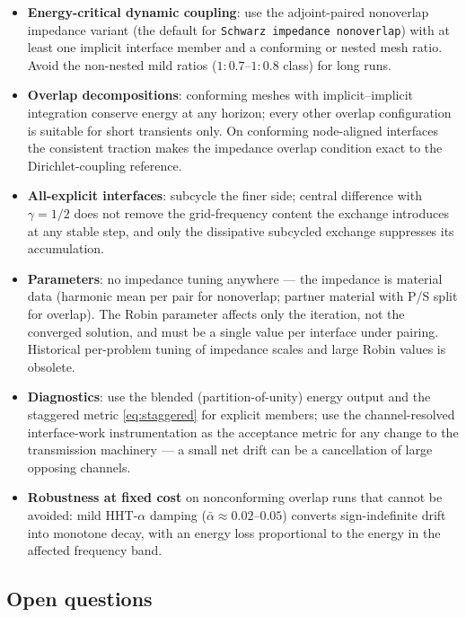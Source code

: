 \documentclass[11pt]{article}
\newcommand{\code}[1]{\texttt{#1}}
\begin{document}
\begin{itemize}[itemsep=2pt]
\item \textbf{Energy-critical dynamic coupling}: use the adjoint-paired
  nonoverlap impedance variant (the default for \code{Schwarz impedance
  nonoverlap}) with at least one implicit interface member and a conforming
  or nested mesh ratio. Avoid the non-nested mild ratios
  ($1{:}0.7$--$1{:}0.8$ class) for long runs.
\item \textbf{Overlap decompositions}: conforming meshes with
  implicit--implicit integration conserve energy at any horizon; every
  other overlap configuration is suitable for short transients only. On
  conforming node-aligned interfaces the consistent traction makes the
  impedance overlap condition exact to the Dirichlet-coupling reference.
\item \textbf{All-explicit interfaces}: subcycle the finer side; central
  difference with $\gamma = 1/2$ does not remove the grid-frequency
  content the exchange introduces at any stable step, and only the
  dissipative subcycled exchange suppresses its accumulation.
\item \textbf{Parameters}: no impedance tuning anywhere --- the impedance
  is material data (harmonic mean per pair for nonoverlap; partner material
  with P/S split for overlap). The Robin parameter affects only the
  iteration, not the converged solution, and must be a single value per
  interface under pairing. Historical per-problem tuning of impedance
  scales and large Robin values is obsolete.
\item \textbf{Diagnostics}: use the blended (partition-of-unity) energy
  output and the staggered metric \eqref{eq:staggered} for explicit
  members; use the channel-resolved interface-work instrumentation as the
  acceptance metric for any change to the transmission machinery --- a
  small net drift can be a cancellation of large opposing channels.
\item \textbf{Robustness at fixed cost} on nonconforming overlap runs that
  cannot be avoided: mild HHT-$\alpha$ damping
  ($\bar\alpha \approx 0.02$--$0.05$) converts sign-indefinite drift into
  monotone decay, with an energy loss proportional to the energy in the affected
  frequency band.
\end{itemize}

\subsection{Open questions}
\end{document}
